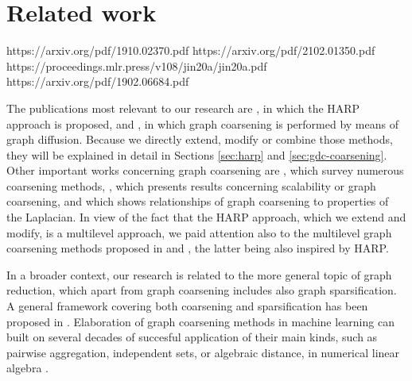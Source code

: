 \section{Related work}

https://arxiv.org/pdf/1910.02370.pdf
https://arxiv.org/pdf/2102.01350.pdf
https://proceedings.mlr.press/v108/jin20a/jin20a.pdf
https://arxiv.org/pdf/1902.06684.pdf

The publications most relevant to our research are \cite{chen_harp_2018}, in which the HARP approach is proposed, and \cite{gasteiger_diffusion_2019}, in which graph coarsening is performed by means of graph diffusion. Because we directly extend, modify or combine those methods, they will be explained in detail in Sections \ref{sec:harp} and \ref{sec:gdc-coarsening}. Other important works concerning graph coarsening are \cite{akyildiz_understanding_2020,chen22graph}, which survey numerous coarsening methods, \cite{huang_scaling_2021}, which presents results concerning scalability or graph coarsening, and \cite{loukas_graph_2019} which shows relationships of graph coarsening to properties of the Laplacian. In view of the fact that the HARP approach, which we extend and modify, is a multilevel approach, we paid attention also to the multilevel graph coarsening methods proposed in \cite{xie20graph} and \cite{zhang21harp}, the latter being also inspired by HARP.

In a broader context, our research is related to the more general topic of graph reduction, which apart from graph coarsening includes also graph sparsification. A general framework covering both coarsening and sparsification has been proposed in \cite{bravohermsdorf19unifying}. Elaboration of graph coarsening methods in machine learning can built on several decades of succesful application of their main kinds, such as pairwise aggregation, independent sets, or algebraic distance, in numerical linear algebra \cite{chen22graph}.
